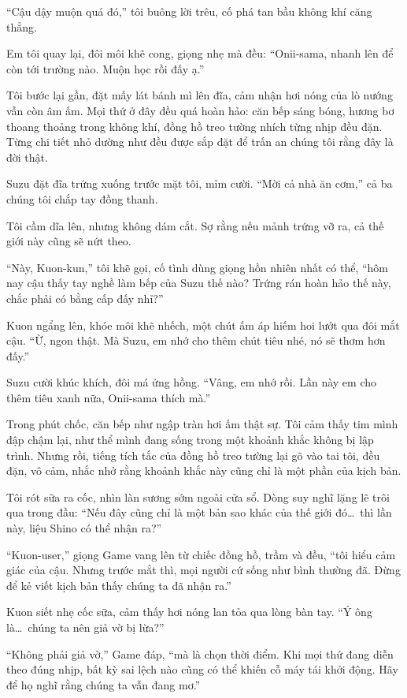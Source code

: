 \documentclass[../main.tex]{subfiles}
\begin{document}
``Cậu dậy muộn quá đó,'' tôi buông lời trêu, cố phá tan bầu không khí căng thẳng.

Em tôi quay lại, đôi môi khẽ cong, giọng nhẹ mà đều: ``Onii-sama, nhanh lên để còn tới trường nào. Muộn học rồi đấy ạ.''

Tôi bước lại gần, đặt mấy lát bánh mì lên đĩa, cảm nhận hơi nóng của lò nướng vẫn còn âm ấm. Mọi thứ ở đây đều quá hoàn hảo: căn bếp sáng bóng, hương bơ thoang thoảng trong không khí, đồng hồ treo tường nhích từng nhịp đều đặn. Từng chi tiết nhỏ dường như đều được sắp đặt để trấn an chúng tôi rằng đây là đời thật.

Suzu đặt đĩa trứng xuống trước mặt tôi, mỉm cười. ``Mời cả nhà ăn cơm,'' cả ba chúng tôi chắp tay đồng thanh.

Tôi cầm dĩa lên, nhưng không dám cắt. Sợ rằng nếu mảnh trứng vỡ ra, cả thế giới này cũng sẽ nứt theo.

``Này, Kuon-kun,'' tôi khẽ gọi, cố tình dùng giọng hồn nhiên nhất có thể, ``hôm nay cậu thấy tay nghề làm bếp của Suzu thế nào? Trứng rán hoàn hảo thế này, chắc phải có bằng cấp đấy nhỉ?''

Kuon ngẩng lên, khóe môi khẽ nhếch, một chút ấm áp hiếm hoi lướt qua đôi mắt cậu. ``Ừ, ngon thật. Mà Suzu, em nhớ cho thêm chút tiêu nhé, nó sẽ thơm hơn đấy.''

Suzu cười khúc khích, đôi má ửng hồng. ``Vâng, em nhớ rồi. Lần này em cho thêm tiêu xanh nữa, Onii-sama thích mà.''

Trong phút chốc, căn bếp như ngập tràn hơi ấm thật sự. Tôi cảm thấy tim mình đập chậm lại, như thể mình đang sống trong một khoảnh khắc không bị lập trình. Nhưng rồi, tiếng tích tắc của đồng hồ treo tường lại gõ vào tai tôi, đều đặn, vô cảm, nhắc nhở rằng khoảnh khắc này cũng chỉ là một phần của kịch bản.

Tôi rót sữa ra cốc, nhìn làn sương sớm ngoài cửa sổ. Dòng suy nghĩ lặng lẽ trôi qua trong đầu: ``Nếu đây cũng chỉ là một bản sao khác của thế giới đó\dots\ thì lần này, liệu Shino có thể nhận ra?''

``Kuon-user,'' giọng Game vang lên từ chiếc đồng hồ, trầm và đều, ``tôi hiểu cảm giác của cậu. Nhưng trước mắt thì, mọi người cứ sống như bình thường đã. Đừng để kẻ viết kịch bản thấy chúng ta đã nhận ra.''

Kuon siết nhẹ cốc sữa, cảm thấy hơi nóng lan tỏa qua lòng bàn tay. ``Ý ông là\dots\ chúng ta nên giả vờ bị lừa?''

``Không phải giả vờ,'' Game đáp, ``mà là chọn thời điểm. Khi mọi thứ đang diễn theo đúng nhịp, bất kỳ sai lệch nào cũng có thể khiến cỗ máy tái khởi động. Hãy để họ nghĩ rằng chúng ta vẫn đang mơ.''
\end{document}

